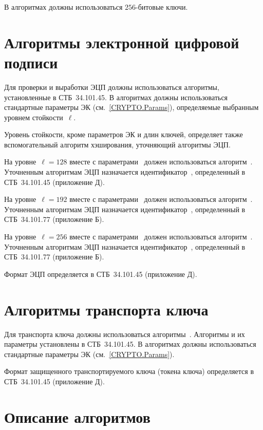 В алгоритмах должны использоваться $256$-битовые ключи.

\section{Алгоритмы электронной цифровой подписи}\label{CRYPTO.Sign}

Для проверки и выработки ЭЦП должны использоваться алгоритмы,
установленные в СТБ~34.101.45. 
%
В алгоритмах должны использоваться стандартные параметры ЭК 
(см.~\ref{CRYPTO.Params}), определяемые выбранным уровнем стойкости~$\ell$.

Уровень стойкости, кроме параметров ЭК и длин ключей,
определяет также вспомогательный алгоритм хэширования,
уточняющий алгоритмы ЭЦП.

На уровне~$\ell=128$ вместе с параметрами~
должен использоваться алгоритм~. 
Уточненным алгоритмам ЭЦП назначается идентификатор~, 
определенный в СТБ~34.101.45 (приложение Д). 

На уровне~$\ell=192$ вместе с параметрами~
должен использоваться алгоритм~. 
Уточненным алгоритмам ЭЦП назначается 
идентификатор~,  
определенный в СТБ~34.101.77 (приложение Б).

На уровне~$\ell=256$ вместе с параметрами~
должен использоваться алгоритм~. 
Уточненным алгоритмам ЭЦП назначается 
идентификатор~,  
определенный в СТБ~34.101.77 (приложение Б).

Формат ЭЦП определяется в СТБ~34.101.45 (приложение Д).

\section{Алгоритмы транспорта ключа}\label{CRYPTO.Transport}

Для транспорта ключа должны использоваться 
алгоритмы~. 
Алгоритмы и их параметры установлены в СТБ~34.101.45. 
%
В алгоритмах должны использоваться стандартные параметры 
ЭК (см.~\ref{CRYPTO.Params}). 

Формат защищенного транспортируемого ключа (токена ключа)
определяется в СТБ~34.101.45 (приложение Д). 

\section{Описание алгоритмов}\label{CRYPTO.AlgId}

